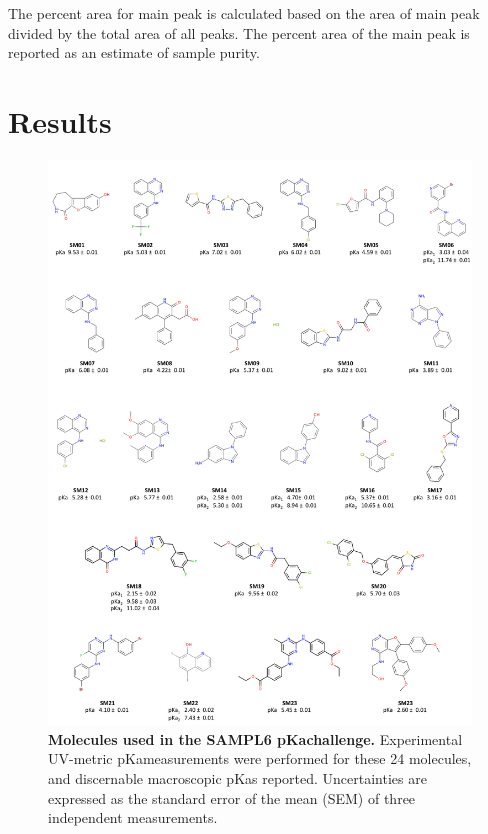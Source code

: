 \documentclass[9pt,lineno]{elife}
\newcommand{\pKa}{pKa}
\begin{document}
The percent area for main peak is calculated based on the area of main peak divided by the total area of all peaks. The percent area of the main peak is reported as an estimate of sample purity.

\section{Results}

\begin{figure}
\includegraphics[width=0.95\linewidth]{figures/SAMPL6_pKa_molecules_fig}
\caption{{\bf Molecules used in the SAMPL6 \pKa  challenge.} 
Experimental UV-metric \pKa measurements were performed for these 24 molecules, and discernable macroscopic {\pKa}s reported. 
Uncertainties are expressed as the standard error of the mean (SEM) of three independent measurements.
}
\label{fig:pKa_molecules}
\end{figure}
\end{document}
